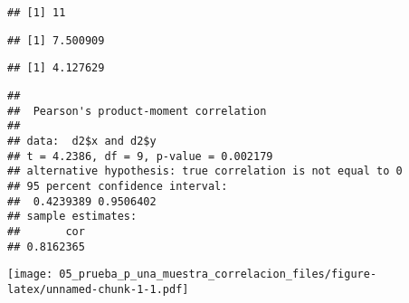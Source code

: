 \documentclass[
]{article}
\newenvironment{Shaded}{\begin{snugshade}}{\end{snugshade}}
\newcommand{\AttributeTok}[1]{\textcolor[rgb]{0.77,0.63,0.00}{#1}}
\newcommand{\CommentTok}[1]{\textcolor[rgb]{0.56,0.35,0.01}{\textit{#1}}}
\newcommand{\DecValTok}[1]{\textcolor[rgb]{0.00,0.00,0.81}{#1}}
\newcommand{\FunctionTok}[1]{\textcolor[rgb]{0.00,0.00,0.00}{#1}}
\newcommand{\NormalTok}[1]{#1}
\newcommand{\SpecialCharTok}[1]{\textcolor[rgb]{0.00,0.00,0.00}{#1}}
\newcommand{\StringTok}[1]{\textcolor[rgb]{0.31,0.60,0.02}{#1}}
\begin{document}
\begin{verbatim}
## [1] 11
\end{verbatim}

\begin{Shaded}
\end{Shaded}

\begin{verbatim}
## [1] 7.500909
\end{verbatim}

\begin{verbatim}
## [1] 4.127629
\end{verbatim}

\begin{Shaded}
\end{Shaded}

\begin{verbatim}
## 
##  Pearson's product-moment correlation
## 
## data:  d2$x and d2$y
## t = 4.2386, df = 9, p-value = 0.002179
## alternative hypothesis: true correlation is not equal to 0
## 95 percent confidence interval:
##  0.4239389 0.9506402
## sample estimates:
##       cor 
## 0.8162365
\end{verbatim}

\begin{Shaded}
\end{Shaded}

\texttt{[image: 05\_prueba\_p\_una\_muestra\_correlacion\_files/figure-latex/unnamed-chunk-1-1.pdf]}
\end{document}
